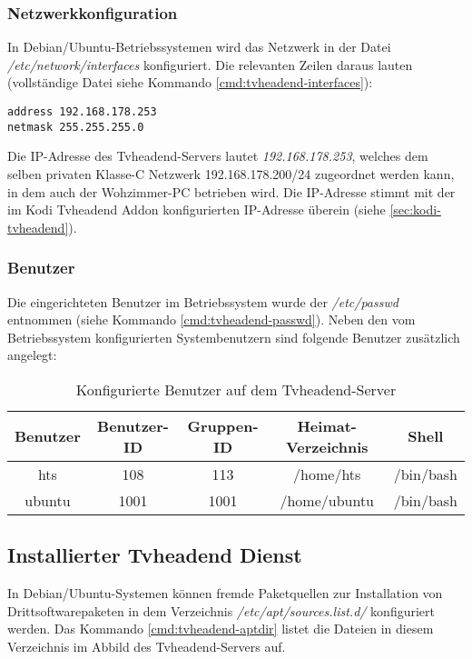 \subsubsection{Netzwerkkonfiguration}
\label{sec:tvheadend-network}

In Debian/Ubuntu-Betriebssystemen wird das Netzwerk in der Datei \textit{/etc/network/interfaces} konfiguriert. Die relevanten Zeilen daraus lauten (vollständige Datei siehe Kommando \autoref{cmd:tvheadend-interfaces}):

\begin{verbatim}
address 192.168.178.253
netmask 255.255.255.0
\end{verbatim}

Die IP-Adresse des Tvheadend-Servers lautet \textit{192.168.178.253}, welches dem selben privaten \mbox{Klasse-C} Netzwerk 192.168.178.200/24 zugeordnet werden kann, in dem auch der Wohzimmer-PC betrieben wird. Die IP-Adresse stimmt mit der im Kodi Tvheadend Addon konfigurierten IP-Adresse überein (siehe \autoref{sec:kodi-tvheadend}).

\subsubsection{Benutzer}
\label{sec:tvheadend-users}

Die eingerichteten Benutzer im Betriebssystem wurde der \textit{/etc/passwd} entnommen (siehe Kommando \autoref{cmd:tvheadend-passwd}). Neben den vom Betriebssystem konfigurierten Systembenutzern sind folgende Benutzer zusätzlich angelegt:

\begin{table}[H]
\centering
\begin{tabular}{ccccc}
\hline 
Benutzer & Benutzer-ID & Gruppen-ID & Heimat-Verzeichnis & Shell \\ 
\hline 
hts & 108 & 113 & /home/hts & /bin/bash \\ 
\hline 
ubuntu & 1001 & 1001 & /home/ubuntu & /bin/bash \\ 
\hline 
\end{tabular} 
\caption{Konfigurierte Benutzer auf dem Tvheadend-Server}
\end{table}

\subsection{Installierter Tvheadend Dienst}

In Debian/Ubuntu-Systemen können fremde Paketquellen zur Installation von Drittsoftwarepaketen in dem Verzeichnis \textit{/etc/apt/sources.list.d/} konfiguriert werden. Das Kommando \autoref{cmd:tvheadend-aptdir} listet die Dateien in diesem Verzeichnis im Abbild des Tvheadend-Servers auf.

